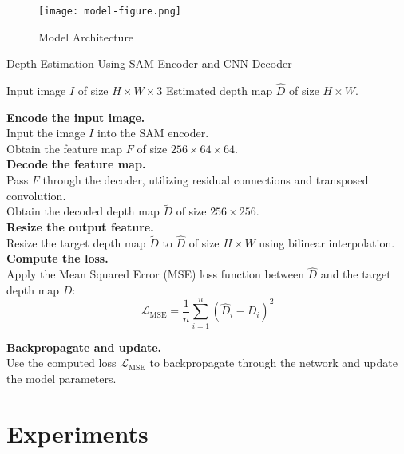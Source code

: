 \documentclass{article}
\begin{document}
\begin{figure}[ht]
\centering
\texttt{[image: model-figure.png]}
\caption{Model Architecture}
\label{fig:model-architecture}
\end{figure}

\begin{algorithm}[]
\caption{Depth Estimation Using SAM Encoder and CNN Decoder}

\begin{algorithmic}[1]
\REQUIRE Input image $I$ of size $H \times W \times 3$
\ENSURE Estimated depth map $\hat{D}$ of size $H \times W$.

\STATE \textbf{Encode the input image.}\\
Input the image $I$ into the SAM encoder.\\
Obtain the feature map $F$ of size $256 \times 64 \times 64$.\\

\STATE \textbf{Decode the feature map.}\\
Pass $F$ through the decoder, utilizing residual connections and transposed convolution.\\
Obtain the decoded depth map $\tilde{D}$ of size $256 \times 256$.\\

\STATE \textbf{Resize the output feature.}\\
Resize the target depth map $\tilde{D}$ to $\hat{D}$ of size $H \times W$ using bilinear interpolation.\\

\STATE \textbf{Compute the loss.}\\
Apply the Mean Squared Error (MSE) loss function between $\hat{D}$ and the target depth map $D$:\\

\[
\mathcal{L}_{\text{MSE}} = \frac{1}{n} \sum_{i=1}^n (\hat{D}_i - D_i)^2
\]

\STATE \textbf{Backpropagate and update.}\\
Use the computed loss $\mathcal{L}_{\text{MSE}}$ to backpropagate through the network and update the model parameters.\\

\end{algorithmic}
\end{algorithm}

\section{Experiments}
\end{document}
